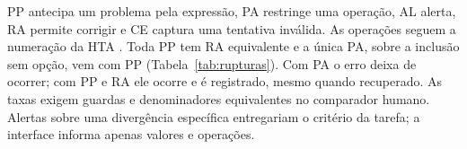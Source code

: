 PP antecipa um problema pela expressão, PA restringe uma operação, AL alerta, RA permite corrigir e CE captura uma tentativa inválida. As operações seguem a numeração da HTA \cite[pp.~5, 8--9]{hts}. Toda PP tem RA equivalente e a única PA, sobre a inclusão sem opção, vem com PP (Tabela~\ref{tab:rupturas}). Com PA o erro deixa de ocorrer; com PP e RA ele ocorre e é registrado, mesmo quando recuperado. As taxas exigem guardas e denominadores equivalentes no comparador humano. Alertas sobre uma divergência específica entregariam o critério da tarefa; a interface informa apenas valores e operações.

